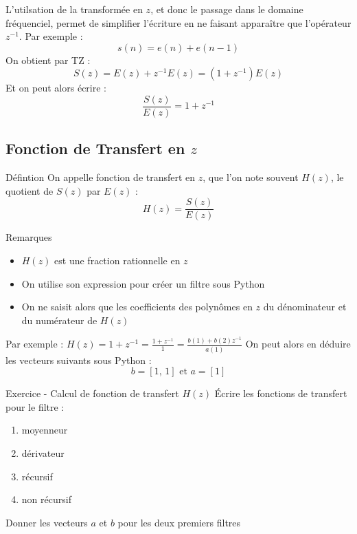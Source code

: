 \documentclass{beamer}
\newcounter{exampleBlockCounter}
\begin{document}

\begin{frame}
\justify
L'utilsation de la transformée en $z$, et donc le passage dans le domaine
fréquenciel, permet de simplifier l'écriture en ne faisant apparaître que
l'opérateur $z^{-1}$. Par exemple :
$$
s(n) = e(n) + e(n-1)
$$
On obtient par TZ :
$$
S(z) = E(z) + z^{-1}E(z) = (1+z^{-1})E(z)
$$
Et on peut alors écrire :
$$
\frac{S(z)}{E(z)} = 1+ z^{-1}
$$
\end{frame}

\subsection{Fonction de Transfert en $z$}

\begin{frame}
\begin{block}{Défintion}
\justify On appelle fonction de transfert en $z$, que l'on note souvent $H(z)$,
le quotient de $S(z)$ par $E(z)$ :
$$
H(z) = \frac{S(z)}{E(z)}
$$ 
\end{block}
\pause
\begin{block}{Remarques}
\begin{itemize}
  \item $H(z)$ est une fraction rationnelle en $z$
  \item On utilise son expression pour créer un filtre sous Python
  \item On ne saisit alors que les coefficients des polynômes en $z$ du
  dénominateur et du numérateur de $H(z)$
\end{itemize}
\end{block}
\end{frame}

\begin{frame}
\justify Par exemple :
$
H(z) = 1+z^{-1} = \frac{1+z^{-1}}{1} = \frac{b(1) + b(2)z^{-1}}{a(1)}
$
\justify On peut alors en déduire les vecteurs suivants sous Python :
$$
b = [1\text{, }1]\text{ et }a = [1]
$$
\begin{exampleblock}{Exercice  - Calcul de fonction de transfert $H(z)$}
\justify Écrire les fonctions de transfert pour le filtre :
\begin{enumerate}
  \item moyenneur
  \item dérivateur
  \item récursif
  \item non récursif
\end{enumerate}
\justify Donner les vecteurs $a$ et $b$ pour les deux premiers filtres
\end{exampleblock}
\end{frame}
\end{document}
